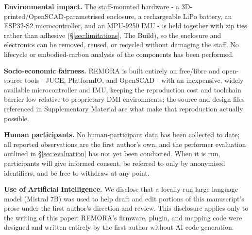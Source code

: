 \documentclass[sigconf,nonacm]{acmart}
\begin{document}
\textbf{Environmental impact.} The staff-mounted hardware - a 3D-printed/OpenSCAD-parametrised
enclosure, a rechargeable LiPo battery, an ESP32-S2 microcontroller, and an MPU-9250 IMU - is held
together with zip ties rather than adhesive (\S\ref{sec:limitations}, The Build), so the enclosure
and electronics can be removed, reused, or recycled without damaging the staff. No lifecycle or
embodied-carbon analysis of the components has been performed.

\textbf{Socio-economic fairness.} REMORA is built entirely on free/libre and open-source tools -
JUCE, PlatformIO, and OpenSCAD - with an inexpensive, widely available microcontroller and IMU,
keeping the reproduction cost and toolchain barrier low relative to proprietary DMI environments; the source and design files referenced in Supplementary Material
are what make that reproduction actually possible.

\textbf{Human participants.} No human-participant data has been collected to date; all reported
observations are the first author's own, and the performer evaluation outlined in
\S\ref{sec:evaluation} has not yet been conducted. When it is run, participants will give informed
consent, be referred to only by anonymised identifiers, and be free to withdraw at any point.

\textbf{Use of Artificial Intelligence.} We disclose that a locally-run large language model (Mistral 7B) was used to help draft and edit
portions of this manuscript's prose under the first author's direction and review. This disclosure
applies only to the writing of this paper: REMORA's firmware, plugin, and mapping code were designed
and written entirely by the first author without AI code generation.



\end{document}
